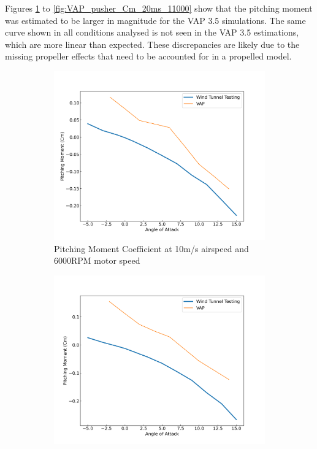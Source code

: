 Figures \ref{fig:VAP_pusher_Cm_10ms_6000} to \ref{fig:VAP_pusher_Cm_20ms_11000} show that the pitching moment was estimated to be larger in magnitude for the VAP 3.5 simulations. The same curve shown in all conditions analysed is not seen in the VAP 3.5 estimations, which are more linear than expected. These discrepancies are likely due to the missing propeller effects that need to be accounted for in a propelled model. 


\begin{figure}[H]
    \centering
    \begin{subfigure}[b]{0.467\textwidth}
        \centering
        \includegraphics[width=\textwidth]{05_Results/VAP/pusher/Cm/10ms_6000RPM_Cm.png}
        \caption{Pitching Moment Coefficient at 10m/s airspeed and 6000RPM motor speed}
        \label{fig:VAP_pusher_Cm_10ms_6000}
    \end{subfigure}
    \begin{subfigure}[b]{0.467\textwidth}
        \centering
        \includegraphics[width=\textwidth]{05_Results/VAP/pusher/Cm/10ms_11000RPM_Cm.png}

\end{subfigure}
\end{figure}
